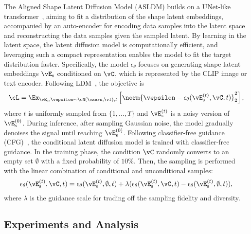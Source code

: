 \documentclass[../../book-main.tex]{subfiles}
\begin{document}
The Aligned Shape Latent Diffusion Model (ASLDM) builds on a
UNet-like transformer~\citep{10203178}, aiming to fit a distribution
of the shape latent embeddings, accompanied by an auto-encoder for
encoding data samples into the latent space and reconstructing the
data samples given the sampled latent.
By learning in the latent
space, the latent diffusion model is computationally efficient, and
leveraging such a compact representation enables the model to fit the
target distribution faster.
Specifically, the model
\(\epsilon_{\theta}\) focuses on generating shape latent embeddings
\(\vE_{\mathrm{s}}\) conditioned on \(\vC\), which is represented by the
CLIP image or text encoder.
Following LDM~\citep{rombach2022high}, the
objective is
\begin{equation}
\cL = \Ex_{\vE_{\mathrm{s}}, \vepsilon \sim
\cN(\vzero,\vI),t} \left[ \norm{\vepsilon - \epsilon_\theta(\vE_{\mathrm{s}}^{(t)}, \vC, t)}_2^2 \right] ,
\end{equation}
where \(t\) is uniformly sampled from \(\{1, \dots, T\}\) and
\(\vE_{\mathrm{s}}^{(t)}\) is a noisy version of
\(\vE_{\mathrm{s}}^{(0)}\).
During inference, after sampling Gaussian
noise, the model gradually denoises the signal until reaching
\(\vE_{\mathrm{s}}^{(0)}\).
Following classifier-free guidance
(CFG)~\citep{ho2021classifierfree}, the conditional latent diffusion
model is trained with classifier-free guidance.
In the training
phase, the condition \(\vC\) randomly converts to an empty set
\(\emptyset\) with a fixed probability of \(10\%\).
Then, the sampling is
performed with the linear combination of conditional and unconditional samples:
\begin{equation}
\epsilon_\theta( \vE_{\mathrm{s}}^{(t)}, \vC, t ) = \epsilon_\theta(
\vE_{\mathrm{s}}^{(t)}, \emptyset, t ) + \lambda
( \epsilon_\theta( \vE_{\mathrm{s}}^{(t)}, \vC, t ) - \epsilon_\theta(
\vE_{\mathrm{s}}^{(t)}, \emptyset, t ) ) ,
\label{eq:cfg-michelangelo}
\end{equation}
where \(\lambda\) is the guidance scale for trading off the sampling
fidelity and diversity.

\subsection{Experiments and Analysis}
\end{document}
